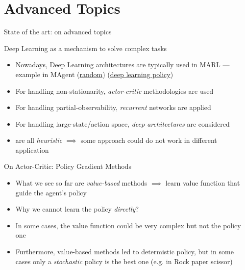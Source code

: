 \documentclass[presentation]{beamer}\mode<presentation>{\usetheme{AMSBolognaFC}}
\begin{document}
\section{Advanced Topics}
\begin{frame}{State of the art: on advanced topics}
	\begin{exampleblock}{Deep Learning as a mechanism to solve complex tasks}
		\begin{itemize}
			\item Nowadays, Deep Learning architectures are typically used in MARL --- example in MAgent (\href{https://figshare.com/articles/media/Collective_Learning_-_no_training/17168900}{random}) (\href{https://figshare.com/articles/media/Collective_Learning_-_DQNN/17168912}{deep learning policy})
			\item For handling non-stationarity, \emph{actor-critic} methodologies are used
			\item For handling partial-observability, \emph{recurrent} networks are applied
			\item For handling large-state/action space, \emph{deep architectures} are considered
			\item[{\color{red}\faThumbsDown}] are all \emph{heuristic} $\implies$ some approach could do not work in different application
		\end{itemize}
	\end{exampleblock}
\end{frame}

\begin{frame}{On Actor-Critic: Policy Gradient Methods}
	\begin{exampleblock}{}
		\begin{itemize}
			\item What we see so far are \emph{value-based} methods $\implies$ learn value function that guide the agent's policy
			\item[\faLightbulbO] Why we cannot learn the policy \emph{directly}?
			\item In some cases, the value function could be very complex but not the policy one
			\item Furthermore, value-based methods led to determistic policy, but in some cases only a \emph{stochastic} policy is the best one (e.g. in Rock paper scissor)
		\end{itemize}
	\end{exampleblock}
\end{frame}
\end{document}

